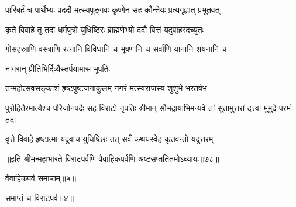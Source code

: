 \twolineshloka
{पारिबर्हं च पार्थेभ्यः प्रददौ मत्स्यपुङ्गवः}
{कृष्णेन सह कौन्तेयः प्रत्यगृह्णात् प्रभूतवत्}


\twolineshloka
{कृते विवाहे तु तदा धर्मपुत्रो युधिष्ठिरः}
{ब्राह्मणेभ्यो ददौ वित्तं यदुपाहरदच्युतः}


\twolineshloka
{गोसहस्राणि वस्त्राणि रत्नानि विविधानि च}
{भूषणानि च सर्वाणि यानानि शयनानि च}


\onelineshloka
{नागरान् प्रीतिभिर्दिव्यैस्तर्पयामास भूपतिः}


\twolineshloka
{तन्महोत्सवसङ्काशं हृष्टपुष्टजनाकुलम्}
{नगरं मत्स्यराजस्य शुशुभे भरतर्षभ}


\threelineshloka
{पुरोहितैरमात्यैश्च पौरैर्जानपदैः सह}
{विराटो नृपतिः श्रीमान् सौभद्रायाभिमन्यवे}
{तां सुतामुत्तरां दत्त्वा मुमुदे परमं तदा}




\twolineshloka
{वृत्ते विवाहे हृष्टात्मा यदुवाच युधिष्ठिरः}
{तत् सर्वं कथयस्वेह कृतवन्तो यदुत्तरम्}

॥इति श्रीमन्महाभारते विराटपर्वणि वैवाहिकपर्वणि अष्टसप्ततितमोऽध्यायः॥७८॥ 

वैवाहिकपर्व समाप्तम्॥५॥ 

समाप्तं च विराटपर्व॥४॥
